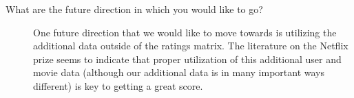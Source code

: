 \documentclass[oneside]{article}
\begin{document}
\begin{description}
\item[What are the future direction in which you would like to go?]
One future direction that we would like to move towards is utilizing the additional data outside of the ratings matrix. The literature on the Netflix prize seems to indicate that proper utilization of this additional user and movie data (although our additional data is in many important ways different) is key to getting a great score.


\end{description}
\end{document}
